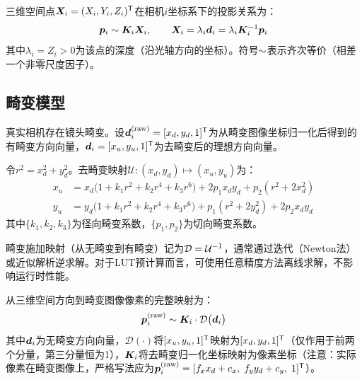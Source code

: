 三维空间点$\bm{X}_i = (X_i, Y_i, Z_i)^{\mathsf{T}}$在相机$i$坐标系下的投影关系为：
\begin{equation}
\bm{p}_i \sim \bm{K}_i \bm{X}_i,
\qquad
\bm{X}_i = \lambda_i \bm{d}_i = \lambda_i \bm{K}_i^{-1} \bm{p}_i
\label{eq:projection}
\end{equation}
其中$\lambda_i = Z_i > 0$为该点的深度（沿光轴方向的坐标）。符号$\sim$表示齐次等价（相差一个非零尺度因子）。

\subsection{畸变模型}
\label{sec:distortion}

真实相机存在镜头畸变。设$\bm{d}_i^{\text{(raw)}} = [x_d, y_d, 1]^{\mathsf{T}}$为从畸变图像坐标归一化后得到的有畸变方向向量，$\bm{d}_i = [x_u, y_u, 1]^{\mathsf{T}}$为去畸变后的理想方向向量。

\begin{definition}
令$r^2 = x_d^2 + y_d^2$。去畸变映射$\mathcal{U}: (x_d, y_d) \mapsto (x_u, y_u)$为：
\begin{align}
x_u &= x_d\bigl(1 + k_1 r^2 + k_2 r^4 + k_3 r^6\bigr)
      + 2p_1 x_d y_d + p_2(r^2 + 2x_d^2) \label{eq:undistort-x} \\
y_u &= y_d\bigl(1 + k_1 r^2 + k_2 r^4 + k_3 r^6\bigr)
      + p_1(r^2 + 2y_d^2) + 2p_2 x_d y_d \label{eq:undistort-y}
\end{align}
其中$\{k_1,k_2,k_3\}$为径向畸变系数，$\{p_1,p_2\}$为切向畸变系数。
\end{definition}

畸变施加映射（从无畸变到有畸变）记为$\mathcal{D} = \mathcal{U}^{-1}$，通常通过迭代（Newton法）或近似解析逆求解。对于LUT预计算而言，可使用任意精度方法离线求解，不影响运行时性能。

\begin{definition}[含畸变的完整投影链]
从三维空间方向到畸变图像像素的完整映射为：
\begin{equation}
\bm{p}_i^{\text{(raw)}} \sim \bm{K}_i \cdot \mathcal{D}\bigl(\bm{d}_i\bigr)
\label{eq:full-proj-dist}
\end{equation}
其中$\bm{d}_i$为无畸变方向向量，$\mathcal{D}(\cdot)$将$[x_u,y_u,1]^{\mathsf{T}}$映射为$[x_d,y_d,1]^{\mathsf{T}}$（仅作用于前两个分量，第三分量恒为1），$\bm{K}_i$将去畸变归一化坐标映射为像素坐标（注意：实际像素在畸变图像上，严格写法应为$\bm{p}_i^{\text{(raw)}} = [f_x x_d + c_x,\; f_y y_d + c_y,\; 1]^{\mathsf{T}}$）。
\end{definition}

